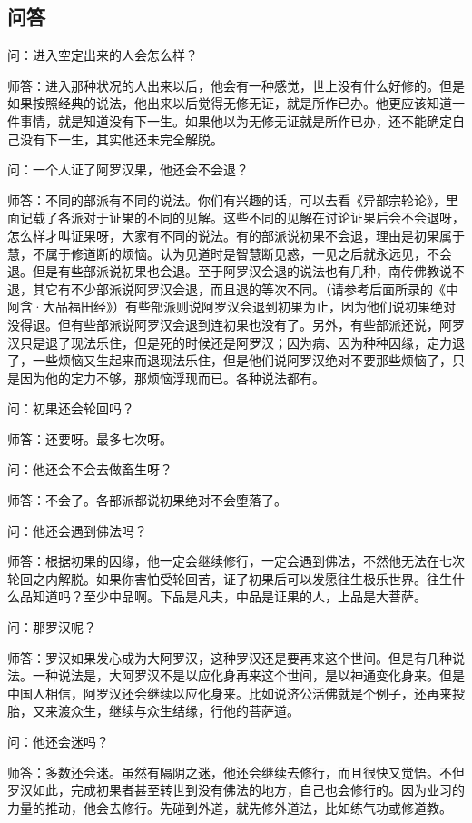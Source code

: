 \documentclass{book}
\begin{document}
\subsection{问答}

问：进入空定出来的人会怎么样？

师答：进入那种状况的人出来以后，他会有一种感觉，世上没有什么好修的。但是如果按照经典的说法，他出来以后觉得无修无证，就是所作已办。他更应该知道一件事情，就是知道没有下一生。如果他以为无修无证就是所作已办，还不能确定自己没有下一生，其实他还未完全解脱。

问：一个人证了阿罗汉果，他还会不会退？

师答：不同的部派有不同的说法。你们有兴趣的话，可以去看《异部宗轮论》，里面记载了各派对于证果的不同的见解。这些不同的见解在讨论证果后会不会退呀，怎么样才叫证果呀，大家有不同的说法。有的部派说初果不会退，理由是初果属于慧，不属于修道断的烦恼。认为见道时是智慧断见惑，一见之后就永远见，不会退。但是有些部派说初果也会退。至于阿罗汉会退的说法也有几种，南传佛教说不退，其它有不少部派说阿罗汉会退，而且退的等次不同。（请参考后面所录的《中阿含·大品福田经》）有些部派则说阿罗汉会退到初果为止，因为他们说初果绝对没得退。但有些部派说阿罗汉会退到连初果也没有了。另外，有些部派还说，阿罗汉只是退了现法乐住，但是死的时候还是阿罗汉；因为病、因为种种因缘，定力退了，一些烦恼又生起来而退现法乐住，但是他们说阿罗汉绝对不要那些烦恼了，只是因为他的定力不够，那烦恼浮现而已。各种说法都有。

问：初果还会轮回吗？

师答：还要呀。最多七次呀。

问：他还会不会去做畜生呀？

师答：不会了。各部派都说初果绝对不会堕落了。

问：他还会遇到佛法吗？

师答：根据初果的因缘，他一定会继续修行，一定会遇到佛法，不然他无法在七次轮回之内解脱。如果你害怕受轮回苦，证了初果后可以发愿往生极乐世界。往生什么品知道吗？至少中品啊。下品是凡夫，中品是证果的人，上品是大菩萨。

问：那罗汉呢？

师答：罗汉如果发心成为大阿罗汉，这种罗汉还是要再来这个世间。但是有几种说法。一种说法是，大阿罗汉不是以应化身再来这个世间，是以神通变化身来。但是中国人相信，阿罗汉还会继续以应化身来。比如说济公活佛就是个例子，还再来投胎，又来渡众生，继续与众生结缘，行他的菩萨道。

问：他还会迷吗？

师答：多数还会迷。虽然有隔阴之迷，他还会继续去修行，而且很快又觉悟。不但罗汉如此，完成初果者甚至转世到没有佛法的地方，自己也会修行的。因为业习的力量的推动，他会去修行。先碰到外道，就先修外道法，比如练气功或修道教。
\end{document}
